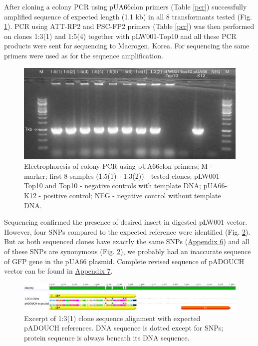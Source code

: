After cloning a colony PCR using pUA66\textunderscore clon primers (Table \ref{pcr}) successfully amplified sequence of expected length (1.1 kb) in all 8 transformants tested (Fig. \ref{colonyPCR}).
PCR using ATT-RP2 and PSC-FP2 primers (Table \ref{pcr}) was then performed on clones 1:3(1) and 1:5(4) together with pLW001-Top10 and all these PCR products were sent for sequencing to Macrogen, Korea.
For sequencing the same primers were used as for the sequence amplification.
\begin{figure}[h!]
  \centering
  \includegraphics[scale=0.2]{text/Pictures/ColonyPCR.jpg}
	\caption{Electrophoresis of colony PCR using pUA66\textunderscore clon primers; M - marker; first 8 samples (1:5(1) - 1:3(2)) - tested clones; pLW001-Top10 and Top10 - negative controls with template DNA; pUA66-K12 - positive control; NEG - negative control without template DNA.}
	\label{colonyPCR}
\end{figure}

Sequencing confirmed the presence of desired insert in digested pLW001 vector.
However, four SNPs compared to the expected reference were identified (Fig. \ref{1:3(1)seq}).
But as both sequenced clones have exactly the same SNPs (\hyperlink{pADOUCHseq}{Appendix 6}) and all of these SNPs are synonymous (Fig. \ref{1:3(1)seq}), we probably had an inaccurate sequence of GFP gene in the pUA66 plasmid.
Complete revised sequence of pADOUCH vector can be found in \hyperlink{pADOUCHwhole}{Appendix 7}.
\begin{figure}[ht]
  \centering
  \includegraphics[scale=0.26]{text/Pictures/pADOUCHseq.png}
	\caption{Excerpt of 1:3(1) clone sequence alignment with expected pADOUCH references. DNA sequence is dotted except for SNPs; protein sequence is always beneath its DNA sequence.}
	\label{1:3(1)seq}
\end{figure}

\shorthandon{-} 


